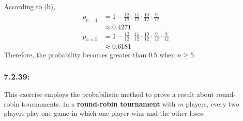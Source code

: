 \documentclass[a4paper]{article}
\begin{document}
\begin{enumerate}[label=\alph*)]
	      According to (b),
	      \begin{align*}
		      p_{n=4} & = 1-\frac{12}{12}\cdot \frac{11}{12}\cdot \frac{10}{12}\cdot \frac{9}{12}                   \\
		              & \approx 0.4271                                                                              \\
		      p_{n=5} & = 1-\frac{12}{12}\cdot \frac{11}{12}\cdot \frac{10}{12}\cdot \frac{9}{12}\cdot \frac{8}{12} \\
		              & \approx 0.6181
	      \end{align*}
	      Therefore, the probability becomes greater than $0.5$ when $n\geq5$.
\end{enumerate}

\subsubsection*{7.2.39:}
This exercise employs the probabilistic method to prove a result about round-robin tournaments. In a \textbf{round-robin tournament} with $m$ players, every two players play one game in which one player wins and the other loses.
\end{document}
